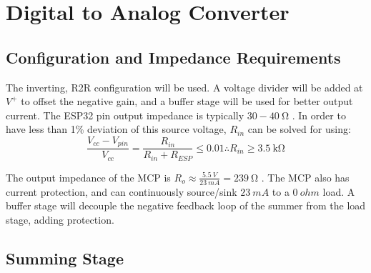 \graphicspath{{content/2_design/figures/}}
\section{Digital to Analog Converter}
\subsection{Configuration and Impedance Requirements}

The inverting, R2R configuration will be used. A voltage divider will be added at $V^+$ to offset the negative gain,
and a buffer stage will be used for better output current.
The ESP32 pin output impedance is typically $30 - \SI{40}{\ohm}$ \cite{datasheetESP}. In order to have less than 1\% deviation of this source voltage, $R_{in}$ can be solved for using:
$$\frac{V_{cc} - V_{pin}}{V_{cc}} = \frac{R_{in}}{R_{in} + R_{ESP}} \leq 0.01 \therefore R_{in} \geq \SI{3.5}{\kilo\ohm} $$

\noindent The output impedance of the MCP is $R_o \approx \frac{\SI{5.5}{V}}{\SI{23}{mA}} = \SI{239}{\ohm}$ \cite{datasheetMCP6242}. The MCP also has current
protection, and can continuously source/sink $\SI{23}{mA}$ to a $\SI{0}{ohm}$ load. A buffer stage will decouple the negative feedback loop of the summer
from the load stage, adding protection.

\subsection{Summing Stage}

